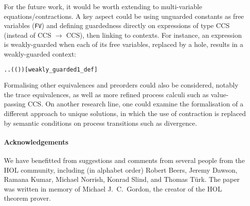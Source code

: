 For the future work, it would be worth extending
to multi-variable equations/contractions. A key aspect could be using unguarded constants as free variables
(\texttt{FV}) and defining guardedness directly on expressions of type CCS (instead of
CCS $\rightarrow$ CCS), then linking to contexts. For instance, an expression is weakly-guarded when each
of its free variables, replaced by a hole, results in a weakly-guarded context:
\begin{alltt}
  \HOLSymConst{\HOLTokenEquiv{}}
\HOLSymConst{\HOLTokenForall{}}.  \HOLSymConst{\HOLTokenIn{}}   \HOLSymConst{\HOLTokenImp{}} \HOLSymConst{\HOLTokenForall{}}.   \HOLSymConst{\HOLTokenConj{}} ( ( ) \HOLSymConst{=} ) \HOLSymConst{\HOLTokenImp{}}  \hfill{[weakly_guarded1_def]}
\end{alltt}

Formalising other equivalences and preorders could also be considered,
notably the trace equivalences, as well as more refined process
calculi such as value-passing CCS.
%
On another research line, one could examine the formalisation of a different
approach \cite{DurierHS17} to unique
solutions, in which the use of contraction is
replaced by semantic conditions on process transitions such as
divergence. 



\paragraph{Acknowledgements}

We have benefitted from suggestions and comments 
from several people from the HOL
community, including (in alphabet order) Robert Beers, Jeremy Dawson,
Ramana Kumar,
Michael Norrish, 
Konrad Slind, and
Thomas T\"{u}rk.
%
The 
paper was written in memory of Michael J.~C.~Gordon, the creator of the HOL theorem prover.
